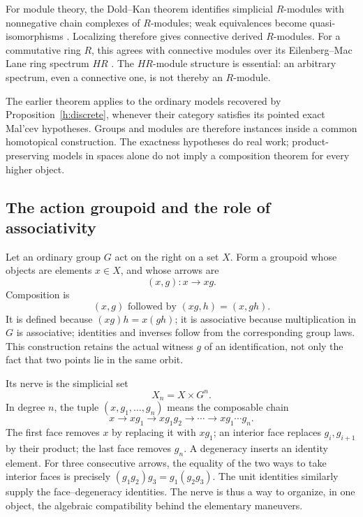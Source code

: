\documentclass[11pt]{article}
\theoremstyle{definition}
\theoremstyle{remark}\newtheorem{remark}[theorem]{Remark}
\begin{document}
For module theory, the Dold--Kan theorem identifies simplicial $R$-modules
with nonnegative chain complexes of $R$-modules; weak equivalences become
quasi-isomorphisms \cite[Tag 019G]{Stacks}.  Localizing therefore gives
connective derived $R$-modules.  For a commutative ring $R$, this agrees
with connective modules over its Eilenberg--Mac Lane ring spectrum $HR$
\cite[Theorem 7.1.2.13]{HA}.  The $HR$-module structure is essential:
an arbitrary spectrum, even a connective one, is not thereby an
$R$-module.

The earlier theorem applies to the ordinary models recovered by
Proposition~\ref{h:discrete}, whenever their category satisfies its pointed
exact Mal'cev hypotheses.  Groups and modules are therefore instances
inside a common homotopical construction.  The exactness hypotheses do
real work; product-preserving models in spaces alone do not imply a
composition theorem for every higher object.

\subsection{The action groupoid and the role of associativity}

Let an ordinary group $G$ act on the right on a set $X$.  Form a groupoid
whose objects are elements $x\in X$, and whose arrows are
\[
 (x,g):x\longrightarrow xg.
\]
Composition is
\[
 (x,g)\text{ followed by }(xg,h)=(x,gh).
\]
It is defined because $(xg)h=x(gh)$; it is associative because multiplication
in $G$ is associative; identities and inverses follow from the corresponding
group laws.  This construction retains the actual witness $g$ of an
identification, not only the fact that two points lie in the same orbit.

Its nerve is the simplicial set
\begin{equation}\label{h:action-nerve}
 X_n=X\times G^n.
\end{equation}
In degree $n$, the tuple $(x,g_1,\ldots,g_n)$ means the composable chain
\[
 x\longrightarrow xg_1\longrightarrow xg_1g_2
   \longrightarrow\cdots\longrightarrow xg_1\cdots g_n.
\]
The first face removes $x$ by replacing it with $xg_1$; an interior face
replaces $g_i,g_{i+1}$ by their product; the last face removes $g_n$.
A degeneracy inserts an identity element.  For three consecutive arrows,
the equality of the two ways to take interior faces is precisely
$(g_1g_2)g_3=g_1(g_2g_3)$.  The unit identities similarly supply the
face--degeneracy identities.  The nerve is thus a way to organize, in
one object, the algebraic compatibility behind the elementary maneuvers.
\end{document}
